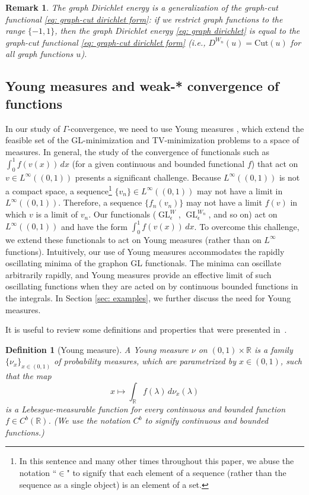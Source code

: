 \documentclass[11pt]{amsart}
\newtheorem{remark}{Remark}[section]
\newtheorem{definition}{Definition}[section]
\def\R{\mathbb{R}}
\def\ep{\epsilon}
\def\GL{\operatorname{GL}}
\numberwithin{equation}{section}
\begin{document}
{\begin{remark}\label{rmk: graph-cut equivalence}
    The graph Dirichlet energy is a generalization of the graph-cut functional \eqref{eq: graph-cut dirichlet form}: if we restrict graph functions to the range $\{-1,1\}$, then the graph Dirichlet energy \eqref{eq: graph dirichlet} is equal to the graph-cut functional \eqref{eq: graph-cut dirichlet form} (i.e., $D^{W_n}(u) = \text{Cut}(u)$ for all graph functions $u$).
\end{remark}




\subsection{Young measures and {weak-*} convergence of functions}\label{sec: ym}

In our study of $\Gamma$-convergence, we need to use Young measures \cite{dacorogna2006weak}, which extend the feasible set of the GL-minimization and TV-minimization problems to a space of measures. In general, the study of {the convergence of} functionals such as $\int_0^1 f(v(x)) \,dx$ (for a given continuous and bounded functional $f$) that act on $v \in L^\infty((0,1))$ presents a significant challenge. Because $L^\infty((0,1))$ is not a compact space, a sequence\footnote{In this sentence and many other times throughout this paper, we abuse the notation ``$\in$" to signify that each element of a sequence (rather than the sequence as a single object) is an element of a set.} $\{v_n\} \in L^\infty((0,1))$ may not have a limit in $L^\infty((0,1))$.  Therefore, a sequence $\{f_n(v_n)\}$ may not have a limit $f(v)$ in which $v$ is a limit of $v_n$. Our functionals ($\GL^W_\ep$, $\GL^{W_n}_\ep$, and so on) act on $L^\infty((0,1))$ and have the form $\int_0^1 f(v(x))\, dx$. To overcome this challenge, we extend these functionals to act on Young measures (rather than on $L^\infty$ functions). Intuitively, our use of Young measures accommodates the rapidly oscillating minima of the graphon GL functionals. The minima can oscillate arbitrarily rapidly, and Young measures provide an effective limit of such oscillating functions when they are acted on by continuous bounded functions in the integrals. In Section \ref{sec: examples}, we further discuss the need for Young measures. 

It is useful to review some definitions and properties that were presented in~\cite{braides2020cut}. 
\begin{definition}[Young measure]\label{def: ym}
    A \emph{Young measure} $\nu$ on $(0,1)\times \R$ is a family $\{\nu_x\}_{x \in (0,1)}$ of probability measures, which are
    parametrized by $x \in (0,1)$, such that the map 
\begin{equation}
    x\mapsto \int_\R f(\lambda) \, d\nu_x(\lambda)
\label{eq: def ym}
\end{equation}
is a Lebesgue-measurable function for every continuous and bounded function $f \in C^b(\R)$.
(We use the notation $C^b$ to signify continuous and bounded functions.)
\end{definition} 


}
\end{document}
